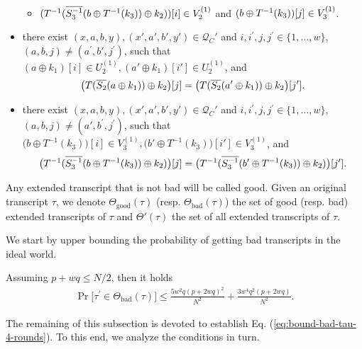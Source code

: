 \begin{definition}
\begin{itemize}[leftmargin=10mm]
\begin{itemize}
		\item $(T^{-1}(\overline{S_3^{-1}}(b\oplus T^{-1}(k_3))\oplus k_2))[i]\in V_2^{(1)}$ and $(b\oplus T^{-1}(k_3))[j]\in V_{3}^{(1)}$.
	\end{itemize}
	\item[\bfour] there exist $(x,a,b,y),(x',a',b',y') \in \mathcal{Q}_{C}'$ and $i, i^{\prime},j, j^{\prime} \in\{1, \ldots, w\}$, $(a,b, j) \neq \left(a^{\prime}, b',j^{\prime}\right)$, such that $(a \oplus k_1)[i]\in U_{2}^{(1)}, (a' \oplus k_1)[i']\in U_{2}^{(1)}$, and
	$$\big(T(\overline{S_2}(a\oplus k_1))\oplus k_2\big)[j]=\big(T(\overline{S_2}(a'\oplus k_1))\oplus k_2\big)[j'].
	$$
	\item[\bfive] there exist $(x,a,b,y),(x',a',b',y') \in \mathcal{Q}_{C}'$ and $i, i^{\prime}, j, j^{\prime} \in\{1, \ldots, w\}$, $(a,b, j) \neq \left(a',b^{\prime}, j^{\prime}\right)$, such that $\big(b \oplus T^{-1}(k_3)\big)[i]\in V_{3}^{(1)}, \big(b' \oplus T^{-1}(k_3)\big)[i']\in V_{3}^{(1)}$, and
	$$\big(T^{-1}(\overline{S_3^{-1}}(b \oplus T^{-1}(k_3))\oplus k_2)\big)[j]=\big(T^{-1}(\overline{S_3^{-1}}(b' \oplus T^{-1}(k_3))\oplus k_2)\big)[j'].
	$$
\end{itemize}
Any extended transcript that is not bad will be called good. Given an original transcript $\tau$, we denote $\Theta_{\mathrm{good}}(\tau)$ (resp. $\Theta_{\mathrm{bad}}(\tau)$) the set of good (resp. bad) extended transcripts of $\tau$ and $\Theta'(\tau)$ the set of all extended transcripts of $\tau$.
\end{definition}



We start by upper bounding the probability of getting bad transcripts in the ideal world.

\begin{lemma}
	\label{lemma:bad-tau-4-rounds}
	
	Assuming $p+wq\leq N/2$, then it holds
	\begin{align}
	{\Pr}\big[\tau^{\prime} \in \Theta_{\mathrm{bad}}(\tau)\big] \leq \frac{5w^2q(p+2wq)^2}{N^2}+
	\frac{3w^4q^2(p+2wq)}{N^2}.
	\label{eq:bound-bad-tau-4-rounds}
	\end{align}
\end{lemma}

The remaining of this subsection is devoted to establish Eq. (\ref{eq:bound-bad-tau-4-rounds}). To this end, we analyze the conditions in turn.



%
%
%
